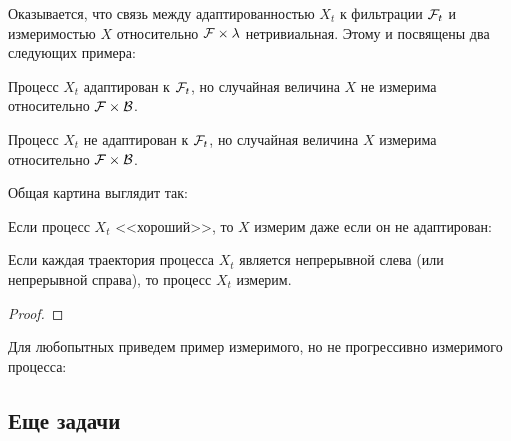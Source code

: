 {Оказывается, что связь между адаптированностью $X_{t}$ к фильтрации $\mathcal{F}_{t}$  и измеримостью $X$ относительно $\mathcal{F}\times\lambda$ нетривиальная. Этому и посвящены два следующих примера:

\begin{myex} Процесс $X_{t}$ адаптирован к $\mathcal{F}_{t}$, но случайная величина $X$ не измерима относительно $\mathcal{F}\times\mathcal{B}$.
\end{myex}


\begin{myex} Процесс $X_{t}$ не адаптирован к $\mathcal{F}_{t}$, но случайная величина $X$ измерима относительно $\mathcal{F}\times\mathcal{B}$.
\end{myex}

Общая картина выглядит так:



Если процесс $X_{t}$ <<хороший>>, то $X$ измерим даже если он не адаптирован:
\begin{myth}
Если каждая траектория процесса $X_{t}$ является непрерывной слева (или непрерывной справа), то процесс $X_{t}$ измерим.
\end{myth}
\begin{proof}

\end{proof}



Для любопытных приведем пример измеримого, но не прогрессивно измеримого процесса:



}\subsection{Еще задачи}

